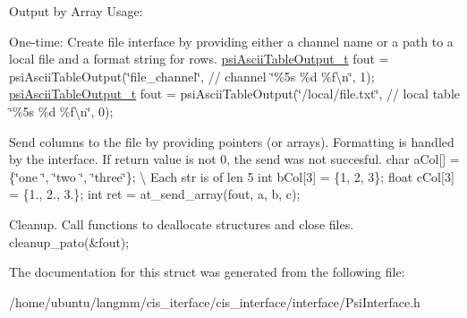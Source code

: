 Output by Array Usage\+:
\begin{DoxyEnumerate}
\item One-\/time\+: Create file interface by providing either a channel name or a path to a local file and a format string for rows. \hyperlink{structpsiAsciiTableOutput__t}{psi\+Ascii\+Table\+Output\+\_\+t} fout = psi\+Ascii\+Table\+Output(\char`\"{}file\+\_\+channel\char`\"{}, // channel \char`\"{}\%5s \%d \%f\textbackslash{}n\char`\"{}, 1); \hyperlink{structpsiAsciiTableOutput__t}{psi\+Ascii\+Table\+Output\+\_\+t} fout = psi\+Ascii\+Table\+Output(\char`\"{}/local/file.\+txt\char`\"{}, // local table \char`\"{}\%5s \%d \%f\textbackslash{}n\char`\"{}, 0);
\item Send columns to the file by providing pointers (or arrays). Formatting is handled by the interface. If return value is not 0, the send was not succesful. char a\+Col\mbox{[}\mbox{]} = \{\char`\"{}one  \char`\"{}, \char`\"{}two  \char`\"{}, \char`\"{}three\char`\"{}\}; \textbackslash{} Each str is of len 5 int b\+Col\mbox{[}3\mbox{]} = \{1, 2, 3\}; float c\+Col\mbox{[}3\mbox{]} = \{1., 2., 3.\}; int ret = at\+\_\+send\+\_\+array(fout, a, b, c);
\item Cleanup. Call functions to deallocate structures and close files. cleanup\+\_\+pato(\&fout); 
\end{DoxyEnumerate}

The documentation for this struct was generated from the following file\+:\begin{DoxyCompactItemize}
\item 
/home/ubuntu/langmm/cis\+\_\+iterface/cis\+\_\+interface/interface/Psi\+Interface.\+h\end{DoxyCompactItemize}
